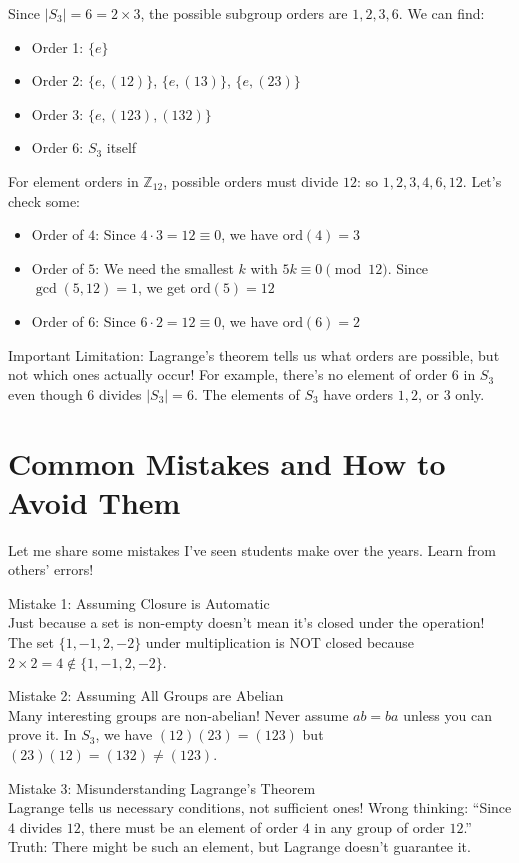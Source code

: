 \documentclass[12pt]{article}
\begin{document}
Since $|S_3| = 6 = 2 \times 3$, the possible subgroup orders are $1, 2, 3, 6$. We can find:
\begin{itemize}
\item Order 1: $\{e\}$
\item Order 2: $\{e, (12)\}$, $\{e, (13)\}$, $\{e, (23)\}$  
\item Order 3: $\{e, (123), (132)\}$
\item Order 6: $S_3$ itself
\end{itemize}

For element orders in $\mathbb{Z}_{12}$, possible orders must divide $12$: so $1, 2, 3, 4, 6, 12$. Let's check some:
\begin{itemize}
\item Order of $4$: Since $4 \cdot 3 = 12 \equiv 0$, we have $\text{ord}(4) = 3$
\item Order of $5$: We need the smallest $k$ with $5k \equiv 0 \pmod{12}$. Since $\gcd(5,12) = 1$, we get $\text{ord}(5) = 12$
\item Order of $6$: Since $6 \cdot 2 = 12 \equiv 0$, we have $\text{ord}(6) = 2$
\end{itemize}

Important Limitation: Lagrange's theorem tells us what orders are possible, but not which ones actually occur! For example, there's no element of order $6$ in $S_3$ even though $6$ divides $|S_3| = 6$. The elements of $S_3$ have orders $1, 2$, or $3$ only.

\section{\textcolor{SectionColor}{Common Mistakes and How to Avoid Them}}

Let me share some mistakes I've seen students make over the years. Learn from others' errors!

Mistake 1: Assuming Closure is Automatic \\
Just because a set is non-empty doesn't mean it's closed under the operation! The set $\{1, -1, 2, -2\}$ under multiplication is NOT closed because $2 \times 2 = 4 \notin \{1, -1, 2, -2\}$.

Mistake 2: Assuming All Groups are Abelian \\
Many interesting groups are non-abelian! Never assume $ab = ba$ unless you can prove it. In $S_3$, we have $(12)(23) = (123)$ but $(23)(12) = (132) \neq (123)$.

Mistake 3: Misunderstanding Lagrange's Theorem \\
Lagrange tells us necessary conditions, not sufficient ones! Wrong thinking: ``Since $4$ divides $12$, there must be an element of order $4$ in any group of order $12$.'' Truth: There might be such an element, but Lagrange doesn't guarantee it.
\end{document}

